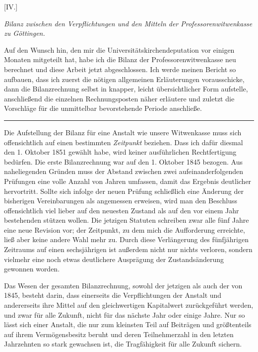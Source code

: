\begin{center}
[IV.]\par\medskip
\textit{Bilanz zwischen den Verpflichtungen und den Mitteln der Professorenwitwenkasse zu Göttingen.}
\end{center}
\noindent\hspace*{\parindent}Auf den Wunsch hin, den mir die Universitätskirchendeputation vor einigen Monaten mitgeteilt hat, habe ich die Bilanz der Professorenwitwenkasse neu berechnet und diese Arbeit jetzt abgeschlossen. Ich werde meinen Bericht so aufbauen, dass ich zuerst die nötigen allgemeinen Erläuterungen vorausschicke, dann die Bilanzrechnung selbst in knapper, leicht übersichtlicher Form aufstelle, anschließend die einzelnen Rechnungsposten näher erläutere und zuletzt die Vorschläge für die unmittelbar bevorstehende Periode anschließe.
\begin{center}\rule{.26\textwidth}{.3pt}\end{center}
\noindent\hspace*{\parindent}Die Aufstellung der Bilanz für eine Anstalt wie unsere Witwenkasse muss sich offensichtlich auf einen bestimmten \textit{Zeitpunkt} beziehen. Dass ich dafür diesmal den 1. Oktober 1851 gewählt habe, wird keiner ausführlichen Rechtfertigung bedürfen. Die erste Bilanzrechnung war auf den 1. Oktober 1845 bezogen. Aus naheliegenden Gründen muss der Abstand zwischen zwei aufeinanderfolgenden Prüfungen eine volle Anzahl von Jahren umfassen, damit das Ergebnis deutlicher hervortritt. Sollte sich infolge der neuen Prüfung schließlich eine Änderung der bisherigen Vereinbarungen als angemessen erweisen, wird man den Beschluss offensichtlich viel lieber auf den neuesten Zustand als auf den vor einem Jahr bestehenden stützen wollen. Die jetzigen Statuten schreiben zwar alle fünf Jahre eine neue Revision vor; der Zeitpunkt, zu dem mich die Aufforderung erreichte, ließ aber keine andere Wahl mehr zu. Durch diese Verlängerung des fünfjährigen Zeitraums auf einen sechsjährigen ist außerdem nicht nur nichts verloren, sondern vielmehr eine noch etwas deutlichere Ausprägung der Zustandsänderung gewonnen worden.

Das Wesen der gesamten Bilanzrechnung, sowohl der jetzigen als auch der von 1845, besteht darin, dass einerseits die Verpflichtungen der Anstalt und andererseits ihre Mittel auf den gleichwertigen Kapitalwert zurückgeführt werden, und zwar für alle Zukunft, nicht für das nächste Jahr oder einige Jahre. Nur so lässt sich einer Anstalt, die nur zum kleinsten Teil auf Beiträgen und größtenteils auf ihrem Vermögensbesitz beruht und deren Teilnehmerzahl in den letzten Jahrzehnten so stark gewachsen ist, die Tragfähigkeit für alle Zukunft sichern.

